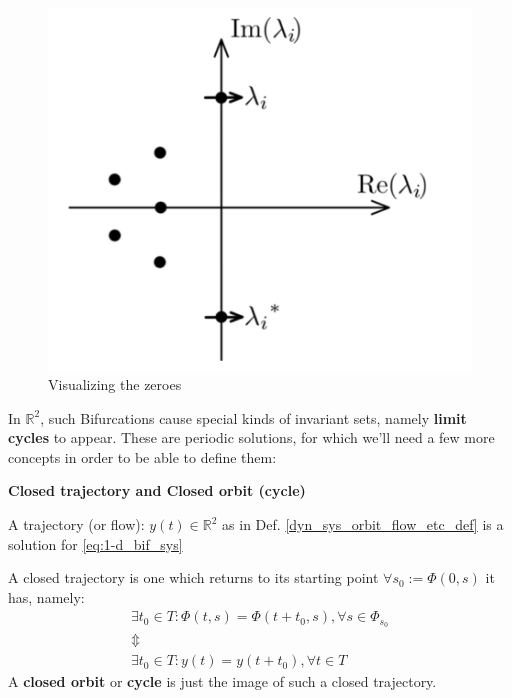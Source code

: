 \begin{figure}[H]
	\includegraphics[width=13cm]{math_pics/hopf-bif-eigenvalue-graph.png}
	\centering
	\caption{Visualizing the zeroes}
\end{figure}

In $\mathbb{R}^2$, such Bifurcations cause special kinds of invariant sets, namely \textbf{limit cycles} to appear. These are periodic solutions, for which we'll need a few more concepts in order to be able to define them:
\begin{definition} \textbf{Closed trajectory and Closed orbit (cycle)}

	A trajectory (or flow): $y(t) \in \mathbb{R}^2$ as in Def. \ref{dyn_sys_orbit_flow_etc_def} is a solution for \ref{eq:1-d_bif_sys}

	A closed trajectory is one which returns to its starting point $\forall s_0 := \Phi(0,s) $ it has, namely:
	\begin{gather*}
		\exists t_0 \in T : \Phi(t,s) = \Phi(t+t_0,s), \forall s \in \Phi_{s_0}     \\
		\Updownarrow \\
		\exists t_0 \in T : y(t) = y(t+t_0), \forall t \in T
	\end{gather*}
	A \textbf{closed orbit} or \textbf{cycle} is just the image of such a closed trajectory.
\end{definition}

